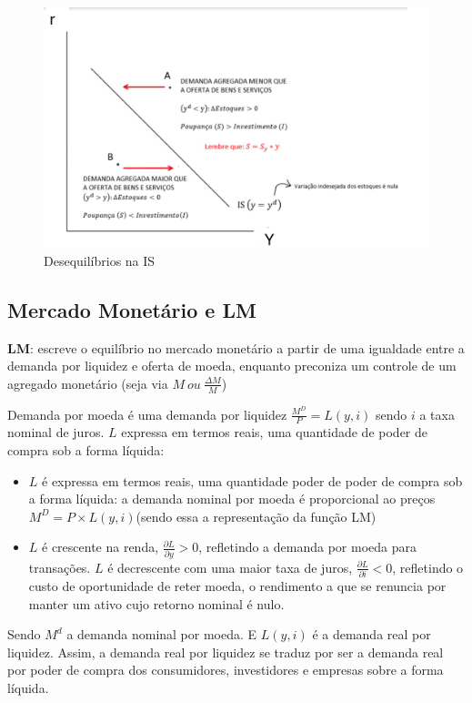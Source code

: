 \documentclass[a4paper,12pt]{article}[abntex2]
\begin{document}
\begin{figure}[H]
    \centering    
    \caption{Desequilíbrios na IS}
    \includegraphics[width=0.75\linewidth]{Imagens/a2i3.png}
\end{figure}

\subsection{\textbf{Mercado Monetário e LM}}

\textbf{LM}: escreve o equilíbrio no mercado monetário a partir de uma igualdade entre a demanda por liquidez e oferta de moeda, enquanto preconiza um controle de um agregado monetário (seja via \(M \ ou \ \frac{\Delta M}{M}\))

Demanda por moeda é uma demanda por liquidez $\frac{M^D}{P}=L(y,i)$ sendo $i$ a taxa nominal de juros. $L$ expressa em termos reais, uma quantidade de poder de compra sob a forma líquida: \begin{itemize}
    \item $L$ é expressa em termos reais, uma quantidade poder de poder de compra sob a forma líquida: a demanda nominal por moeda é proporcional ao preços $M^D=P \times L(y,i)$(sendo essa a representação da função LM)
    \item$L$ é crescente na renda, $\frac{\partial L}{\partial y}>0$, refletindo a demanda por moeda para transações. $L$ é decrescente com uma maior taxa de juros, $\frac{\partial L}{\partial i}<0$, refletindo o custo de oportunidade de reter moeda, o rendimento a que se renuncia por manter um ativo cujo retorno nominal é nulo. 
\end{itemize}

Sendo \(M^d\)   a demanda nominal por moeda. E \(L(y, i)\) é a demanda real por liquidez. Assim, a demanda  real por liquidez se traduz por ser a demanda  real por poder de compra dos consumidores, investidores e empresas sobre a forma líquida. 
\end{document}
